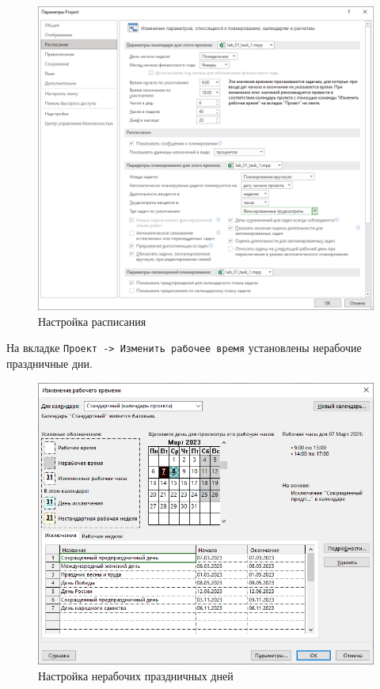 \begin{figure}[H]
	\begin{center}
		\includegraphics[width=\textwidth]{imgs/task_1_1.png}
	\end{center}
	\caption{Настройка расписания}
	\label{img:label}
\end{figure}

На вкладке \texttt{Проект -> Изменить рабочее время} установлены нерабочие праздничные дни.

\begin{figure}[H]
	\begin{center}
		\includegraphics[width=\textwidth]{imgs/task_1_2.png}
	\end{center}
	\caption{Настройка нерабочих праздничных дней}
	\label{img:label}
\end{figure}

